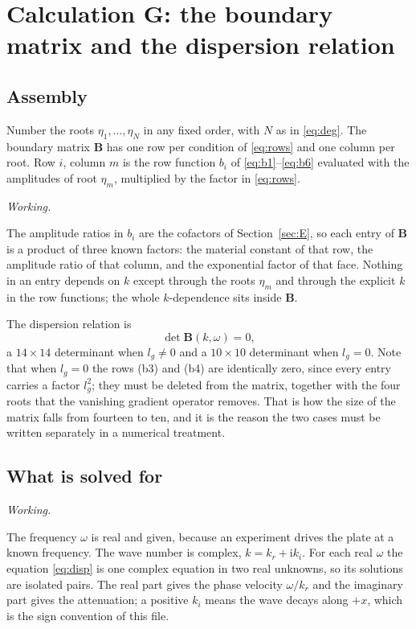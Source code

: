 \documentclass[11pt,a4paper]{article}
\newif\ifshowworked \showworkedtrue
\newenvironment{worked}{\ifshowworked\par\smallskip\noindent\textit{Working.}\par\else\setbox0\vbox\bgroup\fi}{\ifshowworked\par\smallskip\else\egroup\fi}
\newcommand{\ii}{\mathrm{i}}
\begin{document}
\section{Calculation G: the boundary matrix and the dispersion relation}\label{sec:G}

\subsection{Assembly}

Number the roots $\eta_1,\dots,\eta_N$ in any fixed order, with $N$ as in \eqref{eq:deg}. The boundary
matrix $\mathbf B$ has one row per condition of \eqref{eq:rows} and one column per root. Row $i$, column $m$
is the row function $b_i$ of \eqref{eq:b1}--\eqref{eq:b6} evaluated with the amplitudes of root $\eta_m$,
multiplied by the factor in \eqref{eq:rows}.

\begin{worked}
The amplitude ratios in $b_i$ are the cofactors of Section~\ref{sec:E}, so each entry of $\mathbf B$ is a
product of three known factors: the material constant of that row, the amplitude ratio of that column, and
the exponential factor of that face. Nothing in an entry depends on $k$ except through the roots $\eta_m$
and through the explicit $k$ in the row functions; the whole $k$-dependence sits inside $\mathbf B$.
\end{worked}

\noindent The dispersion relation is
\begin{equation}\label{eq:disp}
\det\mathbf B(k,\omega)=0 ,
\end{equation}
a $14\times14$ determinant when $l_g\ne0$ and a $10\times10$ determinant when $l_g=0$. Note that when
$l_g=0$ the rows (b3) and (b4) are identically zero, since every entry carries a factor $l_g^2$; they must be
deleted from the matrix, together with the four roots that the vanishing gradient operator removes. That is
how the size of the matrix falls from fourteen to ten, and it is the reason the two cases must be written
separately in a numerical treatment.

\subsection{What is solved for}

\begin{worked}
The frequency $\omega$ is real and given, because an experiment drives the plate at a known frequency. The
wave number is complex, $k=k_r+\ii k_i$. For each real $\omega$ the equation \eqref{eq:disp} is one complex
equation in two real unknowns, so its solutions are isolated pairs. The real part gives the phase velocity
$\omega/k_r$ and the imaginary part gives the attenuation; a positive $k_i$ means the wave decays along
$+x$, which is the sign convention of this file.
\end{worked}
\end{document}

